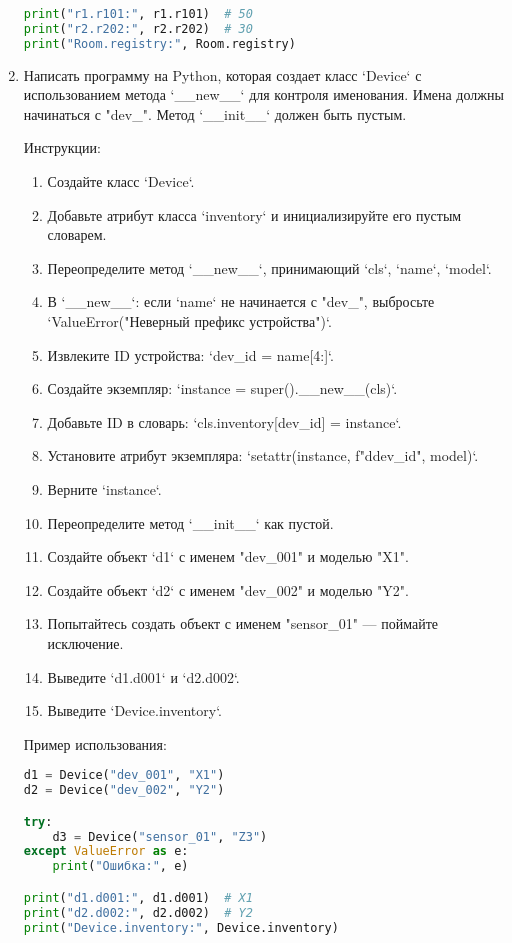 \begin{enumerate}
\begin{lstlisting}[language=Python]
print("r1.r101:", r1.r101)  # 50
print("r2.r202:", r2.r202)  # 30
print("Room.registry:", Room.registry)
\end{lstlisting}

\item Написать программу на Python, которая создает класс `Device` с использованием метода `\_\_new\_\_` для контроля именования. Имена должны начинаться с "dev\_". Метод `\_\_init\_\_` должен быть пустым.

Инструкции:
\begin{enumerate}
    \item Создайте класс `Device`.
    \item Добавьте атрибут класса `inventory` и инициализируйте его пустым словарем.
    \item Переопределите метод `\_\_new\_\_`, принимающий `cls`, `name`, `model`.
    \item В `\_\_new\_\_`: если `name` не начинается с "dev\_", выбросьте `ValueError("Неверный префикс устройства")`.
    \item Извлеките ID устройства: `dev\_id = name[4:]`.
    \item Создайте экземпляр: `instance = super().\_\_new\_\_(cls)`.
    \item Добавьте ID в словарь: `cls.inventory[dev\_id] = instance`.
    \item Установите атрибут экземпляра: `setattr(instance, f"d{dev\_id}", model)`.
    \item Верните `instance`.
    \item Переопределите метод `\_\_init\_\_` как пустой.
    \item Создайте объект `d1` с именем "dev\_001" и моделью "X1".
    \item Создайте объект `d2` с именем "dev\_002" и моделью "Y2".
    \item Попытайтесь создать объект с именем "sensor\_01" — поймайте исключение.
    \item Выведите `d1.d001` и `d2.d002`.
    \item Выведите `Device.inventory`.
\end{enumerate}

Пример использования:
\begin{lstlisting}[language=Python]
d1 = Device("dev_001", "X1")
d2 = Device("dev_002", "Y2")

try:
    d3 = Device("sensor_01", "Z3")
except ValueError as e:
    print("Ошибка:", e)

print("d1.d001:", d1.d001)  # X1
print("d2.d002:", d2.d002)  # Y2
print("Device.inventory:", Device.inventory)
\end{lstlisting}


\end{enumerate}
